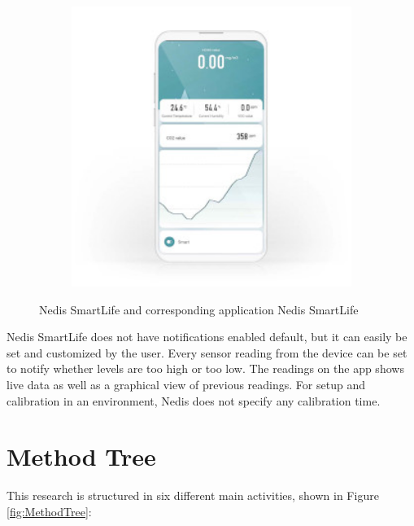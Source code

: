 \begin{figure} [H]
\begin{subfigure}{0.3\textwidth}
         \includegraphics[width=1\textwidth]{figures/NedisApp.jpg}
         \label{fig:NedisDev}
     \end{subfigure}
     \caption{Nedis SmartLife and corresponding application Nedis SmartLife \cite{Nedis}}
     \label{fig:NedisBoth}
\end{figure}

Nedis SmartLife does not have notifications enabled default, but it can easily be set and customized by the user. Every sensor reading from the device can be set to notify whether levels are too high or too low. The readings on the app shows live data as well as a graphical view of previous readings. For setup and calibration in an environment, Nedis does not specify any calibration time.  

\section{Method Tree}
This research is structured in six different main activities, shown in Figure \ref{fig:MethodTree}:

